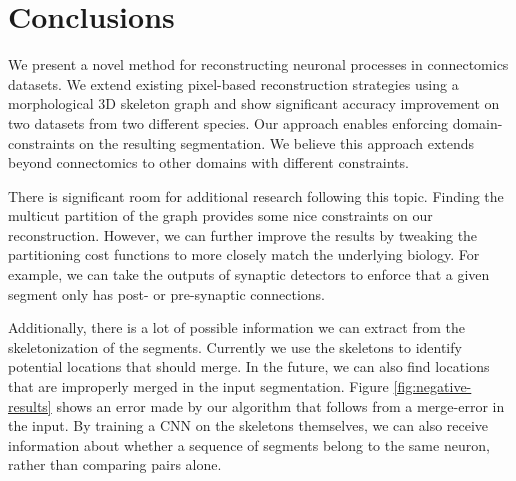 \section{Conclusions}

We present a novel method for reconstructing neuronal processes in connectomics datasets. We extend existing pixel-based reconstruction strategies using a morphological 3D skeleton graph and show significant accuracy improvement on two datasets from two different species. Our approach enables enforcing domain-constraints on the resulting segmentation. We believe this approach extends beyond connectomics to other domains with different constraints.

There is significant room for additional research following this topic. 
Finding the multicut partition of the graph provides some nice constraints on our reconstruction. 
However, we can further improve the results by tweaking the partitioning cost functions to more closely match the underlying biology.
For example, we can take the outputs of synaptic detectors to enforce that a given segment only has post- or pre-synaptic connections. 

Additionally, there is a lot of possible information we can extract from the skeletonization of the segments. 
Currently we use the skeletons to identify potential locations that should merge.
In the future, we can also find locations that are improperly merged in the input segmentation. 
Figure \ref{fig:negative-results} shows an error made by our algorithm that follows from a merge-error in the input. 
By training a CNN on the skeletons themselves, we can also receive information about whether a sequence of segments belong to the same neuron, rather than comparing pairs alone. 